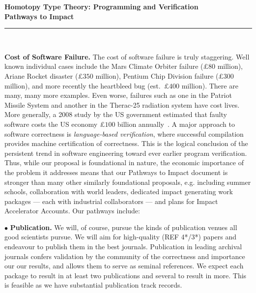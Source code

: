 \documentclass[a4paper,11pt]{article}
\begin{document}
\thispagestyle{plain}

\begin{center}

  {\Large {\bf Homotopy Type Theory: Programming and Verification \\
\vspace{0.2in} 
Pathways to Impact}}\\[1ex]   



\vspace*{-0.1in}



  \rule{150mm}{.5mm}\\[2ex]

\end{center}



\noindent



\vspace*{-0.1in}

{\bf Cost of Software Failure.} The cost of software failure is truly
staggering. Well known individual cases include the Mars Climate
Orbiter failure ($\pounds 80$ million), Ariane Rocket disaster
($\pounds 350$ million), Pentium Chip Division failure ($\pounds 300$
million), and more recently the heartbleed bug (est.\ $\pounds 400$
million).  There are many, many more examples. Even worse, 
failures such as one in the Patriot Missile System and
another in the Therac-25 radiation system have cost lives. More
generally, a 2008 study by the US government estimated that faulty
software costs the US economy $\pounds 100$ billion
annually~\cite{cnet08}.  A
major approach to software correctness is {\em language-based
  verification}, where successful compilation provides machine
certification of correctness. This is the logical conclusion of the
persistent trend in software engineering toward ever earlier program
verification. Thus, while our proposal is foundational in nature, the
economic importance of the problem it addresses means that our
Pathways to Impact document is stronger than many other similarly
foundational proposals, e.g. including summer schools, collaboration
with world leaders, dedicated impact generating work packages --- each
with industrial collaborators --- and plans for Impact Accelerator
Accounts. Our pathways include:

\vspace*{0.02in}

$\bullet$ {\bf Publication.} We will, of course, pursue the kinds of
publication venues all good scientists pursue. We will
aim for high-quality (REF 4*/3*) papers and endeavour to publish them in the best
journals. Publication in leading archival journals 
confers validation by the community of the correctness and importance
our our results, and allows them to serve as seminal references.
We expect each package to result in at least two
publications and several to result in more. This is feasible as we
have substantial publication track records.
\end{document}

